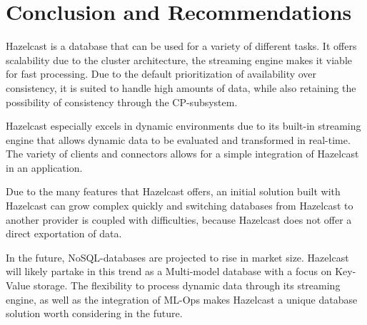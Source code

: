 
\section{Conclusion and Recommendations}
Hazelcast is a database that can be used for a variety of different tasks. It
offers scalability due to the cluster architecture, the streaming engine makes
it viable for fast processing. Due to the default prioritization of availability
over consistency, it is suited to handle high amounts of data, while also
retaining the possibility of consistency through the CP-subsystem.

Hazelcast especially excels in dynamic environments due to its built-in
streaming engine that allows dynamic data to be evaluated and transformed in
real-time. The variety of clients and connectors allows for a simple integration
of Hazelcast in an application.

Due to the many features that Hazelcast offers, an initial solution built with
Hazelcast can grow complex quickly and switching databases from Hazelcast to
another provider is coupled with difficulties, because Hazelcast does not offer
a direct exportation of data.

In the future, NoSQL-databases are projected to rise in market size. Hazelcast
will likely partake in this trend as a Multi-model database with a focus on
Key-Value storage. The flexibility  to process dynamic data through its
streaming engine, as well as the integration of ML-Ops makes Hazelcast a unique
database solution worth considering in the future.
\nocite{*}